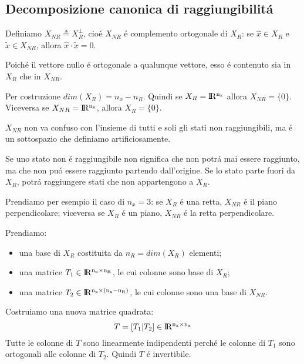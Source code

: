 \documentclass[../main.tex]{subfiles}
\begin{document}
	\subsection{Decomposizione canonica di raggiungibilit\'a}		
		Definiamo $ X_{NR} \triangleq X_R^{\perp} $, cio\'e $ X_{NR} $ \'e complemento ortogonale di $ X_R $: se $ \hat x \in X_R $ e $ \tilde x \in X_{NR} $, allora $ \hat x \cdot \tilde x = 0 $.
		
		Poich\'e il vettore nullo \'e ortogonale a qualunque vettore, esso \'e contenuto sia in $ X_R $ che in $ X_{NR} $.
		
		Per costruzione $ dim\left( X_R \right) = n_x - n_R $. Quindi se $ X_R = \rm I\!R^{n_x} $ allora $ X_{NR} = \{0\} $. Viceversa se $ X_{NR} = \rm I\!R^{n_x} $, allora $ X_R = \{0\} $.
		
		$ X_{NR} $ non va confuso con l'insieme di tutti e soli gli stati non raggiungibili, ma \'e un sottospazio che definiamo artificiosamente.
		
		Se uno stato non \'e raggiungibile non significa che non potr\'a mai essere raggiunto, ma che non pu\'o essere raggiunto partendo dall'origine. Se lo stato parte fuori da $ X_R $, potr\'a raggiungere stati che non appartengono a $ X_R $.
		
		Prendiamo per esempio il caso di $ n_x = 3 $: se $ X_R $ \'e una retta, $ X_{NR} $ \'e il piano perpendicolare; viceversa se $ X_R $ \'e un piano, $ X_{NR} $ \'e la retta perpendicolare.
		
		\noindent
		Prendiamo:
		\begin{itemize}
			\item
				una base di $ X_R $ costituita da $ n_R = dim(X_R) $ elementi;
			\item
				una matrice $ T_1 \in \rm I\!R^{n_x \times n_R} $, le cui colonne sono base di $ X_R $;
			\item
				una matrice $ T_2 \in \rm I\!R^{n_x \times (n_x - n_R)} $, le cui colonne sono una base di $ X_{NR} $.
		\end{itemize}
	
		Costruiamo una nuova matrice quadrata:
		\[
			T = \left[ T_1 | T_2 \right] \in \rm I\!R^{n_x \times n_x}
		\]
		Tutte le colonne di $ T $ sono linearmente indipendenti perch\'e le colonne di $ T_1 $ sono ortogonali alle colonne di $ T_2 $. Quindi $ T $ \'e invertibile.
		
\end{document}
